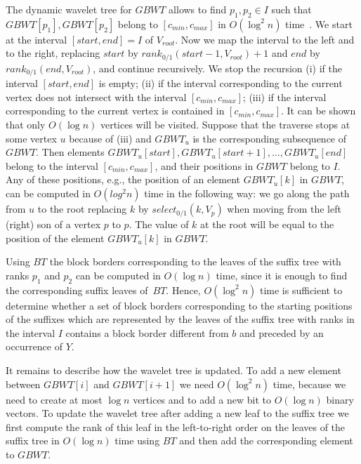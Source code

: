 \documentclass[10pt]{llncs}
\newcommand{\GBWT}{\mathit{GBWT}}
\begin{document}
The dynamic wavelet tree for $\GBWT$ allows to find $p_1, p_2 \in I$ such that $\GBWT[p_1], \GBWT[p_2]$ belong to $[c_{min},c_{max}]$ in $O(\log^2 n)$ time~\cite{Makinen06position-restrictedsubstring}. We start at the interval $[start, end] = I$ of $V_{root}$. Now we map the interval to the left and to the right, replacing $start$ by $rank_{0/1}(start - 1,V_{root}) + 1$ and $end$ by $rank_{0/1}(end,V_{root})$, and continue recursively. We stop the recursion (i) if the interval $[start,end]$ is empty; (ii) if the interval corresponding to the current vertex does not intersect with the interval $[c_{min},c_{max}]$; (iii) if the interval corresponding to the current vertex is contained in $[c_{min},c_{max}]$. It can be shown that only $O(\log n)$ vertices will be visited. Suppose that the traverse stops at some vertex $u$ because of (iii) and $\GBWT_u$ is the corresponding subsequence of $\GBWT$. Then elements $\GBWT_u[start], \GBWT_u[start+1], \ldots, \GBWT_u[end]$ belong to the interval $[c_{min},c_{max}]$, and their positions in $\GBWT$ belong to $I$. Any of these positions, e.g., the position of an element $\GBWT_u[k]$ in $\GBWT$, can be computed in $O(log^2 n)$ time in the following way: we go along the path from $u$ to the root replacing $k$ by $select_{0/1}(k, V_p)$ when moving from the left (right) son of a vertex $p$ to $p$. The value of $k$ at the root will be equal to the position of the element $\GBWT_u[k]$ in $\GBWT$.

Using $BT$ the block borders corresponding to the leaves of the suffix tree with ranks $p_1$ and $p_2$ can be computed in $O(\log n)$ time, since it is enough to find the corresponding suffix leaves of~$BT$. Hence, $O(\log^2 n)$ time is sufficient to determine whether a set of block borders corresponding to the starting positions of the suffixes which are represented by the leaves of the suffix tree with ranks in the interval $I$ contains a block border different from $b$ and preceded by an occurrence of $Y$.

It remains to describe how the wavelet tree is updated. To add a new element between $\GBWT[i]$ and $\GBWT[i+1]$ we need $O(\log^2 n)$ time, because we need to create at most $\log n$ vertices and to add a new bit to $O(\log n)$ binary vectors. To update the wavelet tree after adding a new leaf to the suffix tree we first compute the rank of this leaf in the left-to-right order on the leaves of the suffix tree in $O(\log{n})$ time using $BT$ and then add the corresponding element to $\GBWT$.
\end{document}
